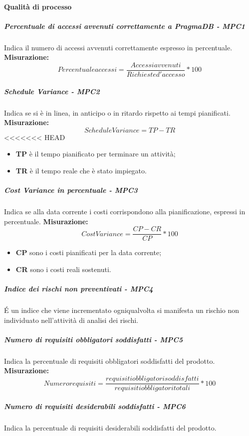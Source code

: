 \paragraph{Qualità di processo}
\subparagraph{Percentuale di accessi avvenuti correttamente a PragmaDB - MPC1}
Indica il numero  di accessi avvenuti correttamente espresso in percentuale.\\
\textbf{Misurazione:}\begin{equation}

Percentuale accessi = \frac{Accessi avvenuti}{Richieste d'accesso} * 100
\end{equation}
\subparagraph{Schedule Variance - MPC2}
Indica se si è in linea, in anticipo o in ritardo rispetto ai tempi pianificati.\\
\textbf{Misurazione:}\begin{equation}
Schedule Variance = TP - TR 
\end{equation}
<<<<<<< HEAD
\begin{itemize}
	\item \textbf{TP} è il tempo pianificato per terminare un attività;
	\item \textbf{TR} è il tempo reale che è stato impiegato.
\end{itemize}		
\subparagraph{Cost Variance in percentuale - MPC3}
Indica se alla data corrente i costi corrispondono alla pianificazione, espressi in percentuale.
\textbf{Misurazione:}\begin{equation}
Cost Variance = \frac{CP - CR}{CP} * 100 
\end{equation}
\begin{itemize}
	\item \textbf{CP} sono i costi pianificati per la data corrente;
	\item \textbf{CR} sono i costi reali sostenuti.
\end{itemize}
\subparagraph{Indice dei rischi non preventivati - MPC4}
É un indice che viene incrementato ogniqualvolta si manifesta un rischio non individuato nell'attività di analisi dei rischi.
\subparagraph{Numero di requisiti obbligatori soddisfatti - MPC5}
Indica la percentuale di requisiti obbligatori soddisfatti del prodotto.
\textbf{Misurazione:}\begin{equation}
Numero requisiti = \frac{requisiti obbligatori soddisfatti}{requisiti obbligatori totali} * 100
\end{equation}
\subparagraph{Numero di requisiti desiderabili soddisfatti - MPC6}
Indica la percentuale di requisiti desiderabili soddisfatti del prodotto.

